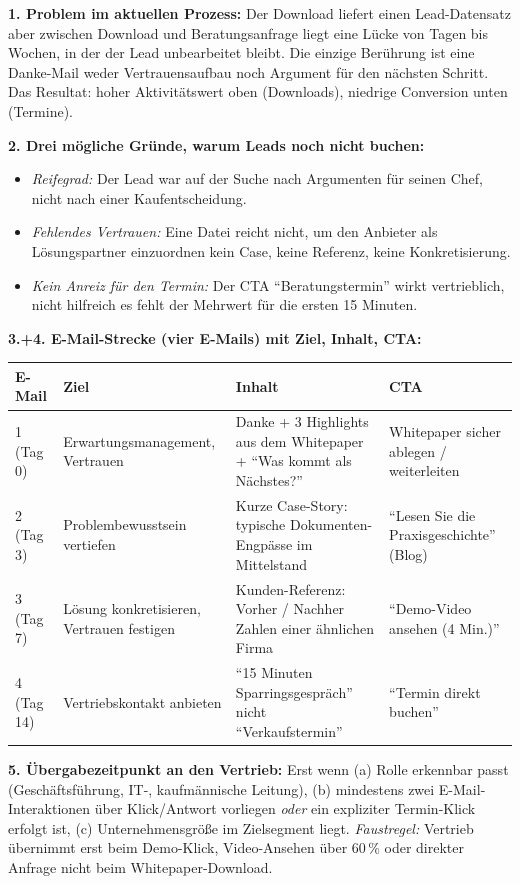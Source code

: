 \documentclass[11pt,a4paper,oneside]{article}
\newcommand{\ytvideo}[2]{%
  \par\vspace{4pt}
  \noindent{\footnotesize\sffamily\color{lpGray}\textbf{Lernvideo:}\ \href{#2}{\textcolor{lpAccent}{#1}}}\par
}
\begin{document}
\ytvideo{Lead Nurturing mit Marketing Automation}{https://youtu.be/sjAkl8pwLgg}

\begin{loesungbox}
\textbf{1. Problem im aktuellen Prozess:}
Der Download liefert einen Lead-Datensatz \textendash{} aber zwischen Download und Beratungsanfrage liegt eine Lücke von Tagen bis Wochen, in der der Lead unbearbeitet bleibt. Die einzige Berührung ist eine Danke-Mail \textendash{} weder Vertrauensaufbau noch Argument für den nächsten Schritt. Das Resultat: hoher Aktivitätswert oben (Downloads), niedrige Conversion unten (Termine).

\smallskip
\textbf{2. Drei mögliche Gründe, warum Leads noch nicht buchen:}
\begin{itemize}
  \item \emph{Reifegrad:} Der Lead war auf der Suche nach Argumenten für seinen Chef, nicht nach einer Kaufentscheidung.
  \item \emph{Fehlendes Vertrauen:} Eine Datei reicht nicht, um den Anbieter als Lösungspartner einzuordnen \textendash{} kein Case, keine Referenz, keine Konkretisierung.
  \item \emph{Kein Anreiz für den Termin:} Der CTA ``Beratungstermin'' wirkt vertrieblich, nicht hilfreich \textendash{} es fehlt der Mehrwert für die ersten 15 Minuten.
\end{itemize}

\smallskip
\textbf{3.+4. E-Mail-Strecke (vier E-Mails) mit Ziel, Inhalt, CTA:}

\smallskip
\begin{tabularx}{\linewidth}{@{}lXXX@{}}
\toprule
\textbf{E-Mail} & \textbf{Ziel} & \textbf{Inhalt} & \textbf{CTA} \\
\midrule
1 (Tag 0) & Erwartungsmanagement, Vertrauen & Danke + 3 Highlights aus dem Whitepaper + ``Was kommt als Nächstes?'' & Whitepaper sicher ablegen / weiterleiten \\
\midrule
2 (Tag 3) & Problembewusstsein vertiefen & Kurze Case-Story: typische Dokumenten-Engpässe im Mittelstand & ``Lesen Sie die Praxisgeschichte'' (Blog) \\
\midrule
3 (Tag 7) & Lösung konkretisieren, Vertrauen festigen & Kunden-Referenz: Vorher / Nachher Zahlen einer ähnlichen Firma & ``Demo-Video ansehen (4 Min.)'' \\
\midrule
4 (Tag 14) & Vertriebskontakt anbieten & ``15 Minuten Sparringsgespräch'' \textendash{} nicht ``Verkaufstermin'' & ``Termin direkt buchen'' \\
\bottomrule
\end{tabularx}

\smallskip
\textbf{5. Übergabezeitpunkt an den Vertrieb:}
Erst wenn (a) Rolle erkennbar passt (Geschäftsführung, IT-, kaufmännische Leitung), (b) mindestens zwei E-Mail-Interaktionen über Klick/Antwort vorliegen \emph{oder} ein expliziter Termin-Klick erfolgt ist, (c) Unternehmensgröße im Zielsegment liegt. \emph{Faustregel:} Vertrieb übernimmt erst beim Demo-Klick, Video-Ansehen über 60\,\% oder direkter Anfrage \textendash{} nicht beim Whitepaper-Download.
\end{loesungbox}
\end{document}
